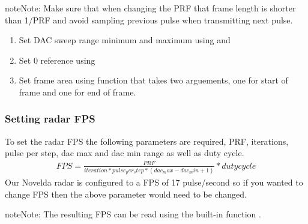 \documentclass[letterpaper,10pt,english]{sphinxmanual}
\begin{document}
\begin{sphinxadmonition}{note}{Note:}
Make sure that when changing the PRF that frame length is shorter than 1/PRF and avoid sampling previous pulse when transmitting next pulse.
\end{sphinxadmonition}
\begin{enumerate}
\def\theenumi{\arabic{enumi}}
\def\labelenumi{\theenumi .}
\makeatletter\def\p@enumii{\p@enumi \theenumi .}\makeatother
\setcounter{enumi}{2}
\item {} 
Set DAC sweep range minimum and maximum using  and 

\item {} 
Set 0 reference using 

\item {} 
Set frame area using function  that takes two arguements, one for start of frame and one for end of frame.

\end{enumerate}


\subsubsection{Setting radar FPS}
\label{\detokenize{Radar information:setting-radar-fps}}
To set the radar FPS the following parameters are required, PRF, iterations, pulse per step, dac max and dac min range as well as duty cycle.
\begin{equation*}
\begin{split}FPS = \frac{PRF}{iteration*pulse_per_step*(dac_max-dac_min+1)} * duty cycle\end{split}
\end{equation*}
Our Novelda radar is configured to a FPS of 17 pulse/second so if you wanted to change FPS then the above parameter would need to be changed.

\begin{sphinxadmonition}{note}{Note:}
The resulting FPS can be read using the built-in function .
\end{sphinxadmonition}
\end{document}
